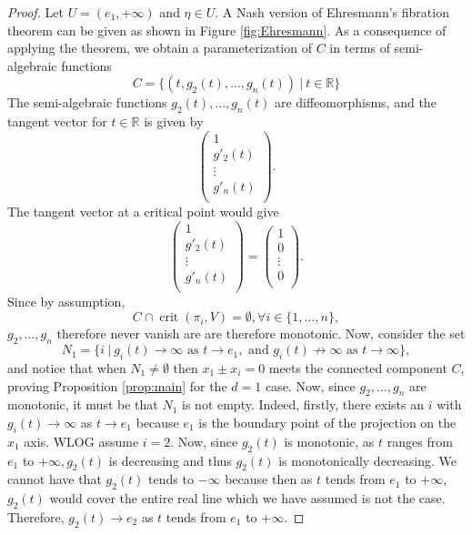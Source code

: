 \documentclass[11pt]{article}
\theoremstyle{definition}
\newcommand{\R}{\mathbb{R}}
\DeclareMathOperator{\crit}{crit}
\begin{document}
\begin{proof}
Let $U = (e_1,+\infty)$ and $\eta \in U.$ A Nash version of Ehresmann's fibration theorem \cite[Th. 2.4 and 3.1]{Shiota1992} can be given as shown in Figure \ref{fig:Ehresmann}. As a consequence of applying the theorem, we obtain a parameterization of $C$ in terms of semi-algebraic functions
\[
C = \big\{(t,g_2(t),\hdots,g_n(t))~|~ t \in \R\big\}
\]
The semi-algebraic functions $g_2(t),\hdots,g_n(t)$ are diffeomorphisms, and the tangent vector for $t \in \R$ is given by 
\[
\begin{pmatrix}
    1 \\
    g'_2(t)\\
    \vdots\\
    g'_n(t)\\
\end{pmatrix}.
\]
The tangent vector at a critical point would give
\[
\begin{pmatrix}
    1 \\
    g'_2(t)\\
    \vdots\\
    g'_n(t)\\
\end{pmatrix}
=
\begin{pmatrix}
    1 \\
    0\\
    \vdots\\
    0\\
\end{pmatrix}.
\]
Since by assumption, 
\[
C \cap \crit(\pi_i,V) = \emptyset, \forall i \in \{1,\hdots,n\},
\]
$g_2,\hdots,g_n$ therefore never vanish are are therefore monotonic. Now, consider the set 
\[
N_1 = \big\{i~|~g_i(t) \rightarrow \infty \textrm{ as } t \rightarrow e_1, \textrm{ and } g_i(t) \not \rightarrow \infty \textrm{ as } t \rightarrow \infty\big\},
\]
and notice that when $N_1 \not = \emptyset$ then $x_1 \pm x_i=0$ meets the connected component $C$, proving Proposition \ref{prop:main} for the $d=1$ case.  Now, since $g_2,\hdots,g_n$ are monotonic, it must be that $N_1$ is not empty. Indeed, firstly, there exists an $i$ with $g_i(t) \rightarrow \infty$ as $t \rightarrow e_1$ because $e_1$ is the boundary point of the projection on the $x_1$ axis. WLOG assume $i=2.$ Now, since $g_2(t)$ is monotonic, as $t$ ranges from $e_1$ to $+\infty, g_2(t)$ is decreasing and thus $g_2(t)$ is monotonically decreasing. We cannot have that $g_2(t)$ tends to $-\infty$ because then as $t$ tends from $e_1$ to $+\infty$, $g_2(t)$ would cover the entire real line which we have assumed is not the case. Therefore, $g_2(t) \rightarrow e_2$ as $t$ tends from $e_1$ to $+\infty$.
\end{proof}
\end{document}
